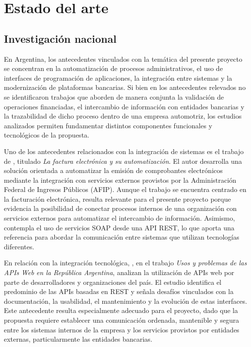 \section{Estado del arte}

\subsection{Investigación nacional}

En Argentina, los antecedentes vinculados con la temática del presente proyecto se concentran en la automatización de procesos administrativos, el uso de interfaces de programación de aplicaciones, la integración entre sistemas y la modernización de plataformas bancarias. Si bien en los antecedentes relevados no se identificaron trabajos que aborden de manera conjunta la validación de operaciones financiadas, el intercambio de información con entidades bancarias y la trazabilidad de dicho proceso dentro de una empresa automotriz, los estudios analizados permiten fundamentar distintos componentes funcionales y tecnológicos de la propuesta.

Uno de los antecedentes relacionados con la integración de sistemas es el trabajo de \citet{ornazabal2023}, titulado \emph{La factura electrónica y su automatización}. El autor desarrolla una solución orientada a automatizar la emisión de comprobantes electrónicos mediante la integración con servicios externos provistos por la Administración Federal de Ingresos Públicos (AFIP). Aunque el trabajo se encuentra centrado en la facturación electrónica, resulta relevante para el presente proyecto porque evidencia la posibilidad de conectar procesos internos de una organización con servicios externos para automatizar el intercambio de información. Asimismo, contempla el uso de servicios SOAP desde una API REST, lo que aporta una referencia para abordar la comunicación entre sistemas que utilizan tecnologías diferentes.

En relación con la integración tecnológica, \citet{constanzo2022}, en el trabajo \emph{Usos y problemas de las APIs Web en la República Argentina}, analizan la utilización de APIs web por parte de desarrolladores y organizaciones del país. El estudio identifica el predominio de las APIs basadas en REST y señala desafíos vinculados con la documentación, la usabilidad, el mantenimiento y la evolución de estas interfaces. Este antecedente resulta especialmente adecuado para el proyecto, dado que la propuesta requiere establecer una comunicación ordenada, mantenible y segura entre los sistemas internos de la empresa y los servicios provistos por entidades externas, particularmente las entidades bancarias.

